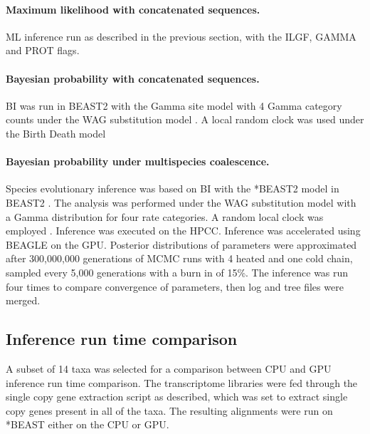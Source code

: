 \documentclass[12pt]{article}
\begin{document}
\paragraph*{Maximum likelihood with concatenated sequences.}
ML inference run as described in the previous section, with the ILGF, GAMMA and PROT flags.
\paragraph*{Bayesian probability with concatenated sequences.}
BI was run in BEAST2 with the Gamma site model with 4 Gamma category counts under the WAG substitution model \cite{whelan2001general}. A local random clock was used  under the Birth Death model %
 

\paragraph*{Bayesian probability under multispecies coalescence.}
Species evolutionary inference was based on BI with the *BEAST2 model in BEAST2 \cite{bouckaert2014beast}. 
The analysis was performed under the WAG substitution model \cite{whelan2001general} with a Gamma distribution for four rate categories. 
A random local clock was employed \cite{drummond2010bayesian}. 
Inference was executed on the HPCC. 
Inference was accelerated using BEAGLE \cite{ayres2011beagle} on the GPU. 
Posterior distributions of parameters were approximated after 300,000,000 generations of MCMC runs with 4 heated and one cold chain, sampled every 5,000 generations  with a burn in of 15\%. 
The inference was run four times to compare convergence of parameters, then log and tree files were merged. 


\subsection*{Inference run time comparison}
A subset of 14 taxa was selected for a comparison between CPU and GPU inference run time comparison. 
The transcriptome libraries were fed through the single copy gene extraction script as described, which was set to extract single copy genes present in all of the taxa. 
The resulting alignments were run on *BEAST either on the CPU or GPU.
\end{document}
